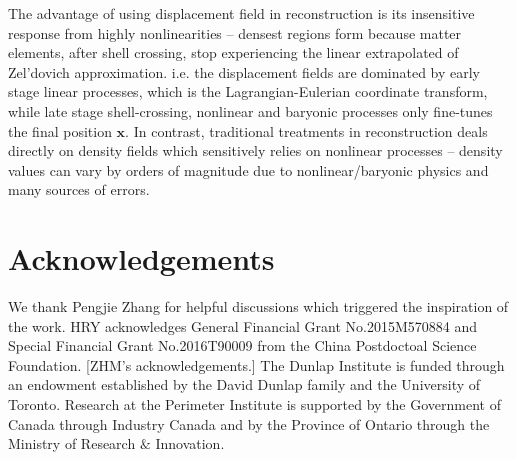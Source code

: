 \documentclass[aps,prd,twocolumn,superscriptaddress,amsfont,amssymb,amsmath,nofootinbib,showpacs,balancelastpage]{revtex4-1}
\newcommand{\bs}{\boldsymbol}
\begin{document}
The advantage of using displacement field in reconstruction is
its insensitive response from highly nonlinearities --
densest regions form because matter elements, after shell crossing,
stop experiencing the linear extrapolated of Zel'dovich approximation.
i.e. the displacement fields are dominated by early stage linear processes,
which is the Lagrangian-Eulerian coordinate transform,
while late stage shell-crossing, nonlinear and baryonic processes
only fine-tunes the final position $\bs x$. In contrast, traditional
treatments in reconstruction deals directly on density fields which sensitively
relies on nonlinear processes --  density values can vary by orders
of magnitude due to nonlinear/baryonic physics and many sources of errors.



\section*{Acknowledgements}
We thank Pengjie Zhang for helpful discussions which triggered
the inspiration of the work.
HRY acknowledges General Financial Grant No.2015M570884 and Special Financial Grant No.2016T90009 from the China Postdoctoal Science Foundation.
[ZHM's acknowledgements.]
The Dunlap Institute is funded through an endowment established by the David Dunlap family and the University of Toronto.
Research at the Perimeter Institute is supported by the Government of Canada
through Industry Canada and by the Province of Ontario through the Ministry of
Research $\&$ Innovation.

%


\end{document}
